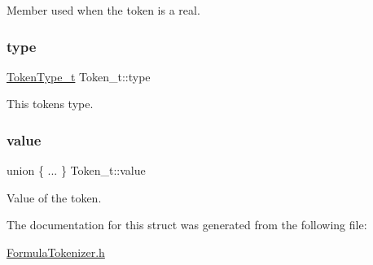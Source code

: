 Member used when the token is a real. \mbox{\label{struct_token__t_ad49347edf094f6ea46bb0bf53ba05845}} 
\subsubsection{\texorpdfstring{type}{type}}
{\footnotesize\ttfamily \hyperlink{_formula_tokenizer_8h_abf84b8f73da30c0f59581856a399081c}{Token\+Type\+\_\+t} Token\+\_\+t\+::type}

This token\textquotesingle{}s type. \mbox{\label{struct_token__t_ad723e275a50a96f45017704383a67c5f}} 
\subsubsection{\texorpdfstring{value}{value}}
{\footnotesize\ttfamily union \{ ... \}   Token\+\_\+t\+::value}

Value of the token. 

The documentation for this struct was generated from the following file\+:\begin{DoxyCompactItemize}
\item 
\hyperlink{_formula_tokenizer_8h}{Formula\+Tokenizer.\+h}\end{DoxyCompactItemize}
